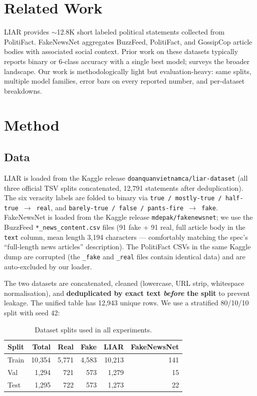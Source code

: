 \documentclass{article}
\begin{document}
\section{Related Work}

LIAR \citep{wang2017liar} provides $\sim$12.8K short labeled political statements collected from PolitiFact. FakeNewsNet \citep{shu2020fakenewsnet} aggregates BuzzFeed, PolitiFact, and GossipCop article bodies with associated social context. Prior work on these datasets typically reports binary or 6-class accuracy with a single best model; \citet{zhou2020survey} surveys the broader landscape. Our work is methodologically light but evaluation-heavy: same splits, multiple model families, error bars on every reported number, and per-dataset breakdowns.

\section{Method}

\subsection{Data}
LIAR is loaded from the Kaggle release \texttt{doanquanvietnamca/liar-dataset} (all three official TSV splits concatenated, 12{,}791 statements after deduplication). The six veracity labels are folded to binary via \texttt{true / mostly-true / half-true $\to$ real}, and \texttt{barely-true / false / pants-fire $\to$ fake}. FakeNewsNet is loaded from the Kaggle release \texttt{mdepak/fakenewsnet}; we use the BuzzFeed \texttt{*\_news\_content.csv} files (91 fake + 91 real, full article body in the \texttt{text} column, mean length 3{,}194 characters --- comfortably matching the spec's ``full-length news articles'' description). The PolitiFact CSVs in the same Kaggle dump are corrupted (the \texttt{\_fake} and \texttt{\_real} files contain identical data) and are auto-excluded by our loader.

The two datasets are concatenated, cleaned (lowercase, URL strip, whitespace normalisation), and \textbf{deduplicated by exact text \emph{before} the split} to prevent leakage. The unified table has 12{,}943 unique rows. We use a stratified 80/10/10 split with seed 42:

\begin{table}[h]
\centering
\caption{Dataset splits used in all experiments.}
\label{tab:splits}
\begin{tabular}{lrrrrr}
\toprule
Split & Total & Real & Fake & LIAR & FakeNewsNet \\
\midrule
Train & 10{,}354 & 5{,}771 & 4{,}583 & 10{,}213 & 141 \\
Val   & 1{,}294 & 721 & 573 & 1{,}279 & 15 \\
Test  & 1{,}295 & 722 & 573 & 1{,}273 & 22 \\
\bottomrule
\end{tabular}
\end{table}
\end{document}
